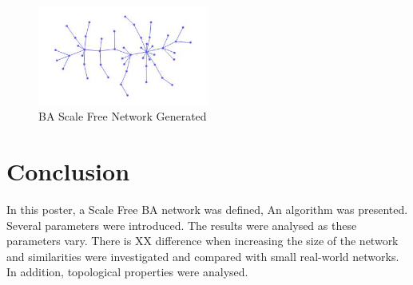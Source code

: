 \documentclass[a0,final]{a0poster}
\begin{document}
\begin{multicols}{3}
\begin{figure}[p]
      \includegraphics[width=0.5\textwidth]{BA.jpg}
  \caption{BA Scale Free Network Generated }
\end{figure}


\section{Conclusion}
In this poster, a Scale Free BA network was defined, An algorithm was presented. Several parameters were introduced. The results were analysed as these parameters vary. There is XX difference when increasing the size of the network and similarities were investigated and compared with small real-world networks. In addition, topological properties were analysed. 




\end{multicols}
\end{document}
